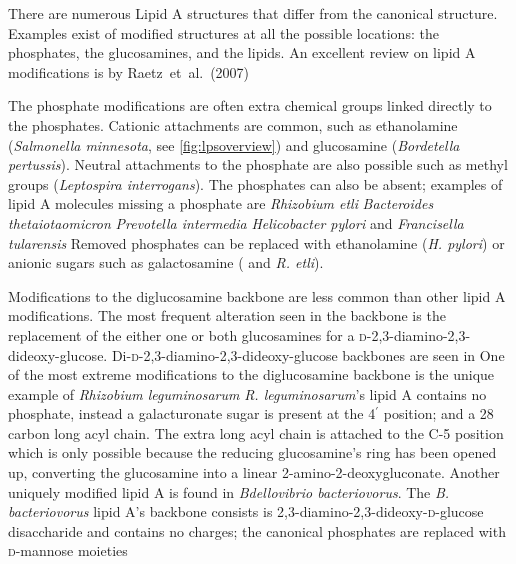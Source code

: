 There are numerous Lipid A structures that differ from the canonical structure. Examples exist of modified structures at all the possible locations: the phosphates, the
glucosamines, and the lipids. An excellent review on lipid A modifications is by Raetz~et~al.~(2007)

 The phosphate modifications are often extra chemical groups linked directly to the phosphates. Cationic attachments are common, such as ethanolamine (\eg \textit{Salmonella
minnesota}, see \cref{fig:lpsoverview}) and glucosamine (\eg \textit{Bordetella pertussis}). Neutral attachments to the phosphate are also possible
such as methyl groups (\eg \textit{Leptospira interrogans}). The phosphates can also be absent; examples of lipid A molecules missing a phosphate
are \textit{Rhizobium etli} \textit{Bacteroides thetaiotaomicron} \textit{Prevotella intermedia}
\textit{Helicobacter pylori} and \textit{Francisella tularensis} Removed phosphates can be replaced with ethanolamine
(\eg \textit{H. pylori}) or anionic sugars such as galactosamine (\eg \caulobacter{} and \textit{R.
etli}).
 
Modifications to the diglucosamine backbone are less common than other lipid A modifications. The most frequent alteration seen in the backbone is the replacement of the either one
or both glucosamines for a \textsc{d}-2,3-diamino-2,3-dideoxy-glucose. Di-\textsc{d}-2,3-diamino-2,3-dideoxy-glucose backbones are seen in \caulobacter{}
One of the most extreme modifications to the diglucosamine backbone is the unique example of \textit{Rhizobium leguminosarum} \textit{R. leguminosarum}'s lipid
A contains no phosphate, instead a galacturonate sugar is present at the
4$^\prime$ position; and a 28 carbon long acyl chain. The extra long acyl chain is attached to the C-5 position
which is only possible because the reducing glucosamine's ring has been opened
up, converting the glucosamine into a linear 2-amino-2-deoxygluconate. Another
uniquely modified lipid A is found in \textit{Bdellovibrio bacteriovorus}. The
\textit{B. bacteriovorus} lipid A's backbone consists is
2,3-diamino-2,3-dideoxy-\textsc{d}-glucose disaccharide and contains no charges; the canonical phosphates
are replaced with \textsc{d}-mannose moieties 

